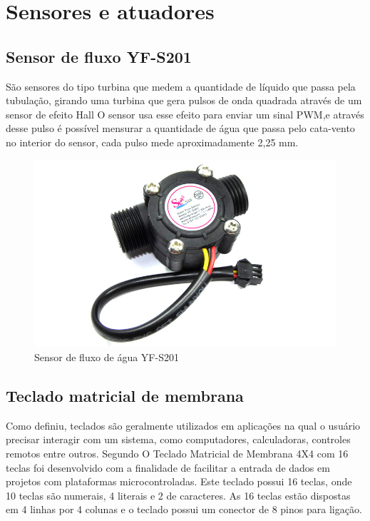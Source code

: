 \section{Sensores e atuadores}

\subsection{Sensor de fluxo YF-S201}

São sensores do tipo turbina que medem a quantidade de líquido que passa pela tubulação, girando uma turbina que
gera pulsos de onda quadrada através de um sensor de efeito Hall\cite{roque2018sistema} O
sensor usa esse efeito para enviar um sinal PWM,e através desse pulso é possível mensurar a quantidade de água que passa pelo cata-vento no interior do sensor, cada pulso mede aproximadamente 2,25 mm.\cite{ms2017automaccao}

\begin{figure}[htbp]
		\centering
		\includegraphics[scale=0.3]{figuras/yf-s201.jpg}
		\caption{Sensor de fluxo de água YF-S201}
		\label{fig:03}
\end{figure}

\subsection{Teclado matricial de membrana}

Como \cite {teclado-matricial-1} definiu, teclados são geralmente utilizados em aplicações na qual o usuário precisar interagir com um sistema, como computadores, calculadoras, controles remotos entre outros. Segundo \cite{teclado-matricial} O Teclado Matricial de Membrana 4X4 com 16 teclas foi desenvolvido com a finalidade de facilitar a entrada de dados em projetos com plataformas microcontroladas. Este teclado possui 16 teclas, onde 10 teclas são numerais, 4 literais e 2 de caracteres. As 16 teclas estão dispostas em 4 linhas por 4 colunas e o teclado possui um conector de 8 pinos para ligação.

